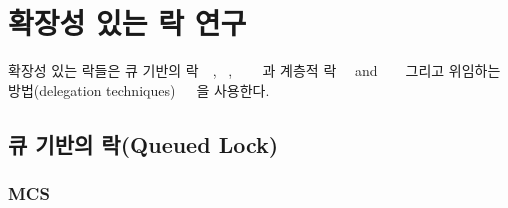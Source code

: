 
\newpage
\section{확장성 있는 락 연구}
\label{sec:lockrelated}

확장성 있는 락들은 큐 기반의 락~\cite{MellorCrummey1991MCS}~\cite{Magnusson1994QLC},
~\cite{Wang2016BeMyGuest},
~\cite{Scott2013SS}
~\cite{Bueso2014MCS}~\cite{Bueso2015STP}과 계층적 락~\cite{Radovic2003HBL}~\cite{Chabbi2016CLL} and
~\cite{Luchangco2006HCQ}
~\cite{Chabbi2015HPL} 그리고 위임하는 방법(delegation
techniques)~\cite{Hendler2010FC}~\cite{Fatourou2012RCS}~\cite{Delegation2014}을 사용한다.


\subsection{큐 기반의 락(Queued Lock)}


\subsubsection{MCS}



